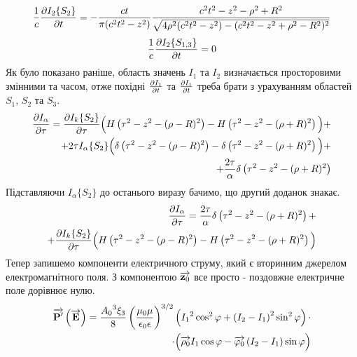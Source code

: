 %
\begin{equation*} \begin{aligned}
\frac{1}{c} \frac{\partial  I_2 \{ S_2 \} }{\partial t} = 
- \frac{ct}{\pi (c^2t^2 - z^2) } \frac{ c^2t^2 - z^2 -  \rho^2 + R^2 } 
{ \sqrt{ 4 \rho^2 (c^2t^2 - z^2) - (c^2t^2 - z^2 + \rho^2 - R^2)^2 } }
\end{aligned} \end{equation*}
%
\begin{equation*} \begin{aligned}
\frac{1}{c} \frac{\partial  I_2 \{ S_{1,3} \} }{\partial t} = 0
\end{aligned} \end{equation*}
%
Як було показано раніше, область значень $ I_1 $ та $ I_2 $ визначається 
просторовими змінними та часом, отже похідні $ \frac{\partial I_1}{\partial t} $ та 
$ \frac{\partial I_1}{\partial t} $ треба брати з урахуванням областей $ S_1 $, $ S_2 $ та
$ S_3 $.
%
\begin{equation*} \begin{aligned}
\frac{\partial I_\alpha}{\partial \tau} = \frac{\partial  I_k \{ S_{2} \} }{\partial \tau} \Big( 
H \left( \tau^2 - z^2 - (\rho - R)^2 \right)  - 
H \left( \tau^2 - z^2 - (\rho + R)^2 \right) \Big) + \\
+ 2 \tau I_\alpha \{ S_{2} \} \Big( 
\delta \left( \tau^2 - z^2 - (\rho - R)^2 \right)  - 
\delta \left( \tau^2 - z^2 - (\rho + R)^2 \right) \Big) + \\
+ \frac{2 \tau}{\alpha} \delta \left( \tau^2 - z^2 - (\rho + R)^2 \right)
\end{aligned} \end{equation*}
%
Підставляючи $ I_\alpha \{ S_{2} \} $ до останього виразу бачимо, що другий доданок знакає.
%
\begin{equation*} \begin{aligned}
\frac{\partial I_\alpha}{\partial \tau} = \frac{2 \tau}{\alpha} 
\delta \left( \tau^2 - z^2 - (\rho + R)^2 \right) + \\
+ \frac{\partial  I_k \{ S_{2} \} }{\partial \tau} \Big( 
H \left( \tau^2 - z^2 - (\rho - R)^2 \right)  - 
H \left( \tau^2 - z^2 - (\rho + R)^2 \right) \Big)
\end{aligned} \end{equation*}
%
Тепер запишемо компоненти електричного струму, який є вторинним джерелом
електромагнітного поля. З компонентою $ \overrightarrow{\mathbf z_0} $ все просто - 
поздовжне електричне поле дорівнює нулю.
%
\textcolor{lightgray}{ \begin{equation*} \begin{aligned}
\overrightarrow{\mathbf P^\prime} \left( \overrightarrow{\mathbf E} \right) = 
\frac{ {A_0}^3 \xi_3 }{ 8 } \left( \frac{\mu_0 \mu}
{\epsilon_0 \epsilon} \right)^{3/2} \left( {I_1}^2 \cos^2 \varphi + 
\left( I_2 - I_1 \right)^2 \sin^2 \varphi \right) \cdot \\ 
\cdot \Big( \overrightarrow{\mathbf \rho_0} I_1 \cos \varphi - 
\overrightarrow{\mathbf  \varphi_0 } \left( I_2 - I_1 \right) \sin \varphi \Big)
\end{aligned} \end{equation*} }
